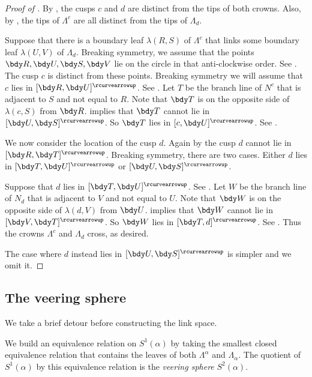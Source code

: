 \documentclass[12pt]{amsart}
\newcommand{\acw}{\rcurvearrowup}
\begin{document}
\begin{proof}[Proof of ]
By , the cusps $c$ and $d$ are distinct from the tips of both crowns.  Also, by , the tips of $\Lambda^c$ are all distinct from the tips of $\Lambda_d$. 

Suppose that there is a boundary leaf $\lambda(R,S)$ of $\Lambda^c$ that links some boundary leaf $\lambda(U,V)$ of $\Lambda_d$.  Breaking symmetry, we assume that the points $\bdy R, \bdy U, \bdy S, \bdy V$ lie on the circle in that anti-clockwise order.  See .  The cusp $c$ is distinct from these points.  Breaking symmetry we will assume that $c$ lies in $[\bdy R, \bdy U]^\acw$.  See .  Let $T$ be the branch line of $N^c$ that is adjacent to $S$ and not equal to $R$.  Note that $\bdy T$ is on the opposite side of $\lambda(c, S)$ from $\bdy R$.   implies that $\bdy T$ cannot lie in $[\bdy U, \bdy S]^\acw$.  So $\bdy T$ lies in $[c, \bdy U]^\acw$.  See .

We now consider the location of the cusp $d$.  Again by  the cusp $d$ cannot lie in $[\bdy R, \bdy T]^\acw$.  Breaking symmetry, there are two cases.  Either $d$ lies in $[\bdy T, \bdy U]^\acw$ or $[\bdy U, \bdy S]^\acw$.

Suppose that $d$ lies in $[\bdy T, \bdy U]^\acw$.  See .  Let $W$ be the branch line of $N_d$ that is adjacent to $V$ and not equal to $U$.  Note that $\bdy W$ is on the opposite side of $\lambda(d, V)$ from $\bdy U$.   implies that $\bdy W$ cannot lie in $[\bdy V, \bdy T]^\acw$.  So $\bdy W$ lies in $[\bdy T, d]^\acw$.  See .  Thus the crowns $\Lambda^c$ and $\Lambda_d$ cross, as desired. 

The case where $d$ instead lies in $[\bdy U, \bdy S]^\acw$ is simpler and we omit it.
\end{proof}

\subsection{The veering sphere}
\label{Sec:VeeringSphere}

We take a brief detour before constructing the link space.

\begin{definition}
\label{Def:VeeringSphere}
We build an equivalence relation on $S^1(\alpha)$ by taking the smallest closed equivalence relation that contains the leaves of both $\Lambda^\alpha$ and $\Lambda_\alpha$. The quotient of $S^1(\alpha)$ by this equivalence relation is the \emph{veering sphere} $S^2(\alpha)$.
\end{definition}
\end{document}
